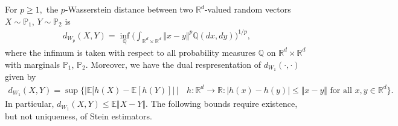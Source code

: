 \documentclass{article}
\begin{document}
For $p \geq 1,$ the $p$-Wasserstein distance between two $\mathbb{R}^d$-valued random vectors $X \sim \mathbb{P}_1$, $Y \sim \mathbb{P}_2$ is 
\begin{align*}
    d_{W_p}( X,Y) = \inf_{\mathbb{Q}} \bigg( \int_{\mathbb{R}^d \times \mathbb{R}^d} \Vert x-y\Vert^p \mathbb{Q}(dx,dy) \bigg)^{1/p},
\end{align*}
where the infimum is taken with respect to all probability measures $\mathbb{Q}$ on $\mathbb{R}^d \times \mathbb{R}^d$ with marginals $\mathbb{P}_1$, $\mathbb{P}_2$. Moreover, we have the dual respresentation of $d_{W_1}(\cdot, \cdot)$ given by
\begin{align*}
    d_{W_1}(X,Y) = \sup \Big\{ \vert \mathbb{E}[h(X) - \mathbb{E}[h(Y)] \vert \, \big\vert \, &  h:\mathbb{R}^d \rightarrow \mathbb{R}:  \vert h(x) - h(y) \vert \leq \Vert x-y \Vert \text{ for all } x,y \in \mathbb{R}^d \Big\}.
\end{align*}
In particular, $d_{W_1}(X,Y) \leq \mathbb{E}  \Vert X-Y \Vert$. The following bounds require existence, but not   uniqueness,  of Stein estimators.
\end{document}
